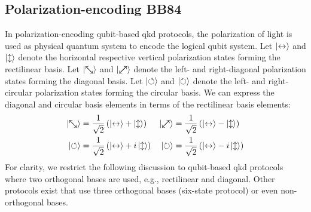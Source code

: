 \FloatBarrier
\subsection{Polarization-encoding BB84}

In polarization-encoding qubit-based \gls{qkd} protocols, the polarization of light is used as physical quantum system to encode the logical qubit system.
Let $\ket{\leftrightarrow}$ and $\ket{\updownarrow}$ denote the horizontal respective vertical polarization states forming the rectilinear basis.
Let $\ket{\nwsearrow}$ and $\ket{\neswarrow}$ denote the left- and right-diagonal polarization states forming the diagonal basis.
Let $\ket{\circlearrowleft}$ and $\ket{\circlearrowright}$ denote the left- and right-circular polarization states forming the circular basis.
We can express the diagonal and circular basis elements in terms of the rectilinear basis elements:
\begin{align}
	\ket{\nwsearrow}
	&=
	\frac{1}{\sqrt{2}}
	\left(
		\ket{\leftrightarrow}
		+
		\ket{\updownarrow}
	\right)
	&
	\ket{\neswarrow}
	&=
	\frac{1}{\sqrt{2}}
	\left(
		\ket{\leftrightarrow}
		-
		\ket{\updownarrow}
	\right)
	\\
	\ket{\circlearrowleft}
	&=
	\frac{1}{\sqrt{2}}
	\left(
		\ket{\leftrightarrow}
		+
		i\ket{\updownarrow}
	\right)
	&
	\ket{\circlearrowright}
	&=
	\frac{1}{\sqrt{2}}
	\left(
		\ket{\leftrightarrow}
		-
		i\ket{\updownarrow}
	\right)
\end{align}
For clarity, we restrict the following discussion to qubit-based \gls{qkd} protocols where two orthogonal bases are used, e.g., rectilinear and diagonal.
Other protocols exist that use three orthogonal bases (six-state protocol) or even non-orthogonal bases.


